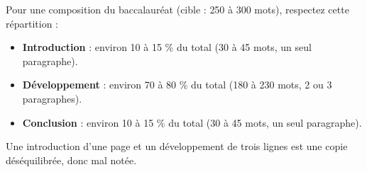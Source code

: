 \documentclass[11pt]{article}
\newcommand{\cle}[1]{{\popxbold\color{popdark}#1}}
\begin{document}
\begin{aretenir}
Pour une composition du baccalauréat (cible : \cle{250 à 300 mots}), respectez cette répartition :
\begin{itemize}
\item \textbf{Introduction} : environ 10 à 15 \% du total (30 à 45 mots, un seul paragraphe).
\item \textbf{Développement} : environ 70 à 80 \% du total (180 à 230 mots, 2 ou 3 paragraphes).
\item \textbf{Conclusion} : environ 10 à 15 \% du total (30 à 45 mots, un seul paragraphe).
\end{itemize}
Une introduction d'une page et un développement de trois lignes est une copie déséquilibrée, donc mal notée.
\end{aretenir}
\end{document}

